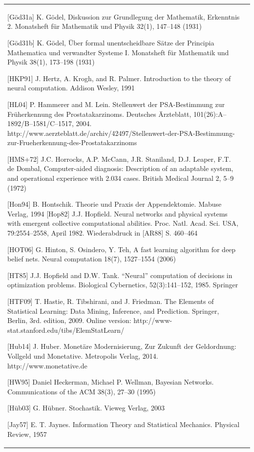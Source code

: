\documentclass[10pt]{book}
\begin{document}
\begin{center}
\begin{tabular}{|l|l|}
[Göd31a] K. Gödel, Diskussion zur Grundlegung der Mathematik, Erkenntnis 2. Monatsheft für Mathematik und Physik 32(1), 147–148 (1931)

[Göd31b] K. Gödel, Über formal unentscheidbare Sätze der Principia Mathematica und verwandter Systeme I. Monatsheft für Mathematik und Physik 38(1), 173–198 (1931)

[HKP91] J. Hertz, A. Krogh, and R. Palmer. Introduction to the theory of neural computation. Addison Wesley, 1991

[HL04] P. Hammerer and M. Lein. Stellenwert der PSA-Bestimmung zur Früherkennung des Prostatakarzinoms. Deutsches Ärzteblatt, 101(26):A–1892/B–1581/C–1517, 2004. http://www.aerzteblatt.de/archiv/42497/Stellenwert-der-PSA-Bestimmung-zur-Frueherkennung-des-Prostatakarzinoms

[HMS+72] J.C. Horrocks, A.P. McCann, J.R. Staniland, D.J. Leaper, F.T. de Dombal, Computer-aided diagnosis: Description of an adaptable system, and operational experience with 2.034 cases. British Medical Journal 2, 5–9 (1972)

[Hon94] B. Hontschik. Theorie und Praxis der Appendektomie. Mabuse Verlag, 1994
[Hop82] J.J. Hopfield. Neural networks and physical systems with emergent collective computational abilities. Proc. Natl. Acad. Sci. USA, 79:2554–2558, April 1982. Wiederabdruck in [AR88] S. 460–464

[HOT06] G. Hinton, S. Osindero, Y. Teh, A fast learning algorithm for deep belief nets. Neural computation 18(7), 1527–1554 (2006)

[HT85] J.J. Hopfield and D.W. Tank. “Neural” computation of decisions in optimization problems. Biological Cybernetics, 52(3):141–152, 1985. Springer

[HTF09] T. Hastie, R. Tibshirani, and J. Friedman. The Elements of Statistical Learning: Data Mining, Inference, and Prediction. Springer, Berlin, 3rd. edition, 2009. Online version: http://www-stat.stanford.edu/tibs/ElemStatLearn/

[Hub14] J. Huber. Monetäre Modernisierung, Zur Zukunft der Geldordnung: Vollgeld und Monetative. Metropolis Verlag, 2014. http://www.monetative.de

[HW95] Daniel Heckerman, Michael P. Wellman, Bayesian Networks. Communications of the ACM 38(3), 27–30 (1995)

[Hüb03] G. Hübner. Stochastik. Vieweg Verlag, 2003

[Jay57] E. T. Jaynes. Information Theory and Statistical Mechanics. Physical Review, 1957


\end{tabular}
\end{center}
\end{document}
